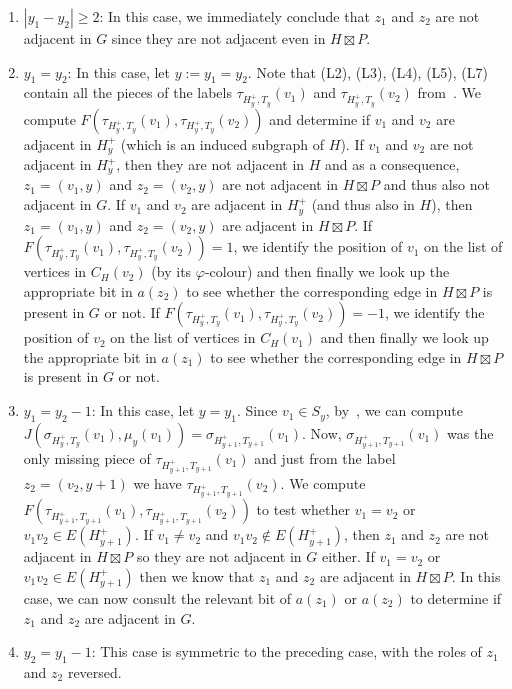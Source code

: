 \documentclass[kpfonts]{patmorin}
\let\ge\geqslant
\begin{document}
\begin{enumerate}
  \item $|y_1-y_2|\ge 2$: 
  In this case, we immediately conclude that $z_1$ and $z_2$ are not adjacent in $G$ since they are not adjacent even in $H\boxtimes P$.
  \item $y_1=y_2$:  
  In this case, let $y:=y_1=y_2$. 
  Note that (L2), (L3), (L4), (L5), (L7) contain all the pieces of the labels $\tau_{H^+_y,T_y}(v_1)$ and $\tau_{H^+_y,T_y}(v_2)$ from~. 
  We compute $F(\tau_{H^+_y,T_y}(v_1),\tau_{H^+_y,T_y}(v_2))$ and determine if $v_1$ and $v_2$ are adjacent in $H^+_y$ (which is an induced subgraph of $H$). 
  If $v_1$ and $v_2$ are not adjacent in $H^+_y$, then they are not adjacent in $H$ and as a consequence, $z_1=(v_1,y)$ and $z_2=(v_2,y)$ are not adjacent in $H\boxtimes P$ and thus also not adjacent in $G$.
  If $v_1$ and $v_2$ are adjacent in $H^+_y$ (and thus also in $H$), then $z_1=(v_1,y)$ and $z_2=(v_2,y)$ are adjacent in $H\boxtimes P$. 
  If $F(\tau_{H^+_y,T_y}(v_1),\tau_{H^+_y,T_y}(v_2))=1$, 
  we identify the position of $v_1$ on the list of vertices in $C_H(v_2)$ (by its $\varphi$-colour) 
  and then finally we look up the appropriate bit in $a(z_2)$ to see whether the corresponding edge in $H\boxtimes P$ is present in $G$ or not.
  If $F(\tau_{H^+_y,T_y}(v_1),\tau_{H^+_y,T_y}(v_2))=-1$, 
  we identify the position of $v_2$ on the list of vertices in $C_H(v_1)$
  and then finally we look up the appropriate bit in $a(z_1)$ to see whether the corresponding edge in $H\boxtimes P$ is present in $G$ or not.

  \item $y_1=y_2-1$: 
  In this case, let $y=y_1$. 
  Since $v_1 \in S_y$, by~,
  we can compute $J(\sigma_{H^+_y,T_y}(v_1),\mu_y(v_1))=\sigma_{H^+_{y+1},T_{y+1}}(v_1)$. 
  Now, $\sigma_{H^+_{y+1},T_{y+1}}(v_1)$ was the only missing piece of $\tau_{H^+_{y+1},T_{y+1}}(v_1)$ and 
  just from the label $z_2=(v_2,y+1)$ we have $\tau_{H^+_{y+1},T_{y+1}}(v_2)$. 
  We compute $F(\tau_{H^+_{y+1},T_{y+1}}(v_1),\tau_{H^+_{y+1},T_{y+1}}(v_2))$ to test whether $v_1=v_2$ or $v_1v_2\in E(H^+_{y+1})$. 
  If $v_1\neq v_2$ and $v_1v_2\not\in E(H^+_{y+1})$, then $z_1$ and $z_2$ are not adjacent in $H\boxtimes P$ so they are not adjacent in $G$ either.
  If $v_1=v_2$ or $v_1v_2\in E(H^+_{y+1})$ then we know that $z_1$ and $z_2$ are adjacent in $H\boxtimes P$.  
  In this case, we can now consult the relevant bit of $a(z_1)$ or $a(z_2)$ to determine if $z_1$ and $z_2$ are adjacent in $G$.

  \item $y_2=y_1-1$:  This case is symmetric to the preceding case, with the roles of $z_1$ and $z_2$ reversed.
\end{enumerate}
\end{document}
